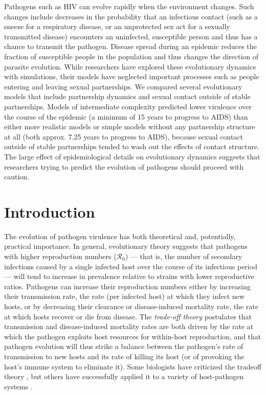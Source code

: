 \documentclass[10pt,letterpaper]{article}
\newcommand{\rzero}{{\mathcal R}_0}
\begin{document}

Pathogens such as HIV can evolve rapidly when the environment changes.
Such changes include decreases in the probability that an infectious
contact (such as a sneeze for a respiratory disease, or an unprotected
sex act for a sexually transmitted disease) encounters an uninfected,
susceptible person and thus has a chance to transmit the
pathogen. Disease spread during an epidemic reduces the fraction of
susceptible people in the population and thus changes the direction of
parasite evolution.  While researchers have explored these
evolutionary dynamics with simulations, their models have neglected
important processes such as people entering and leaving sexual
partnerships. We compared several evolutionary models that include
partnership dynamics and sexual contact outside of stable
partnerships. Models of intermediate complexity predicted lower
virulence over the course of the epidemic (a minimum of 15 years to
progress to AIDS) than either more realistic models or simple models
without any partnership structure at all (both approx. 7.25 years to
progress to AIDS), because sexual contact outside of stable
partnerships tended to wash out the effects of contact
structure. The large effect of epidemiological details on evolutionary
dynamics suggests that researchers trying to predict the evolution of
pathogens should proceed with caution.

\linenumbers

\section*{Introduction}

The evolution of pathogen virulence has both 
theoretical and, potentially, practical
importance. In general, evolutionary theory suggests that
pathogens with higher reproduction numbers ($\rzero$) --- that is, the number of secondary infections caused by a single infected host over the course of its infectious period --- will tend to increase in prevalence relative to strains with lower reproductive ratios.
Pathogens can increase their reproduction numbers either
by increasing their transmission rate, 
the rate (per infected host) at which they
infect new hosts, or by decreasing their clearance or disease-induced
mortality rate, the rate
at which hosts recover or die from disease.
The \emph{trade-off theory} \cite{alizon_virulence_2009} postulates that
transmission and disease-induced mortality rates are both driven by the rate at which
the pathogen exploits host resources for within-host reproduction, 
and that pathogen
evolution will thus strike a balance between the
pathogen's rate of transmission
to new hosts and its rate of killing its host (or of provoking
the host's immune system to eliminate it).
Some biologists have criticized the tradeoff theory
\cite{EbertBull2003,alizon_adaptive_2015}, but others have
successfully applied it to a variety of host-pathogen systems \cite{Dwyer+1990,mackinnon1999genetic,jensen2006empirical,deroode2008virulence}.
\end{document}
